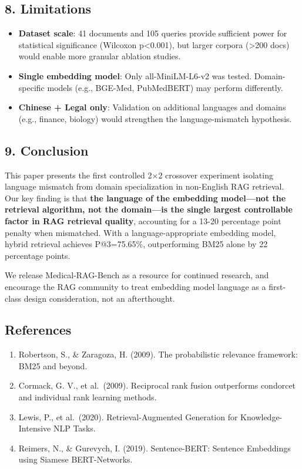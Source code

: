 \documentclass[
]{article}
\providecommand{\tightlist}{%
  \setlength{\itemsep}{0pt}\setlength{\parskip}{0pt}}
\begin{document}
\subsection{8. Limitations}\label{limitations}

\begin{itemize}
\tightlist
\item
  \textbf{Dataset scale}: 41 documents and 105 queries provide
  sufficient power for statistical significance (Wilcoxon
  p\textless0.001), but larger corpora (\textgreater200 docs) would
  enable more granular ablation studies.
\item
  \textbf{Single embedding model}: Only all-MiniLM-L6-v2 was tested.
  Domain-specific models (e.g., BGE-Med, PubMedBERT) may perform
  differently.
\item
  \textbf{Chinese + Legal only}: Validation on additional languages and
  domains (e.g., finance, biology) would strengthen the
  language-mismatch hypothesis.
\end{itemize}

\subsection{9. Conclusion}\label{conclusion}

This paper presents the first controlled 2×2 crossover experiment
isolating language mismatch from domain specialization in non-English
RAG retrieval. Our key finding is that \textbf{the language of the
embedding model---not the retrieval algorithm, not the domain---is the
single largest controllable factor in RAG retrieval quality}, accounting
for a 13-20 percentage point penalty when mismatched. With a
language-appropriate embedding model, hybrid retrieval achieves
P@3=75.65\%, outperforming BM25 alone by 22 percentage points.

We release Medical-RAG-Bench as a resource for continued research, and
encourage the RAG community to treat embedding model language as a
first-class design consideration, not an afterthought.

\subsection{References}\label{references}

\begin{enumerate}
\def\labelenumi{\arabic{enumi}.}
\tightlist
\item
  Robertson, S., \& Zaragoza, H. (2009). The probabilistic relevance
  framework: BM25 and beyond.
\item
  Cormack, G. V., et al.~(2009). Reciprocal rank fusion outperforms
  condorcet and individual rank learning methods.
\item
  Lewis, P., et al.~(2020). Retrieval-Augmented Generation for
  Knowledge-Intensive NLP Tasks.
\item
  Reimers, N., \& Gurevych, I. (2019). Sentence-BERT: Sentence
  Embeddings using Siamese BERT-Networks.
\end{enumerate}
\end{document}
